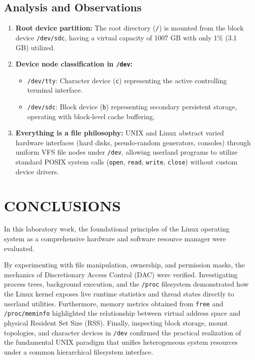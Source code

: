 \documentclass[12pt,a4paper]{report}
\numberwithin{equation}{chapter}
\numberwithin{figure}{chapter}
\numberwithin{table}{chapter}
\begin{document}
\section{Analysis and Observations}
\begin{enumerate}
    \item \textbf{Root device partition:} The root directory (\texttt{/}) is mounted from the block device \texttt{/dev/sdc}, having a virtual capacity of 1007 GB with only 1\% (3.1 GB) utilized.
    \item \textbf{Device node classification in \texttt{/dev}:}
    \begin{itemize}
        \item \texttt{/dev/tty}: Character device (\texttt{c}) representing the active controlling terminal interface.
        \item \texttt{/dev/sdc}: Block device (\texttt{b}) representing secondary persistent storage, operating with block-level cache buffering.
    \end{itemize}
    \item \textbf{Everything is a file philosophy:} UNIX and Linux abstract varied hardware interfaces (hard disks, pseudo-random generators, consoles) through uniform VFS file nodes under \texttt{/dev}, allowing userland programs to utilize standard POSIX system calls (\texttt{open}, \texttt{read}, \texttt{write}, \texttt{close}) without custom device drivers.
\end{enumerate}

\chapter{CONCLUSIONS}
In this laboratory work, the foundational principles of the Linux operating system as a comprehensive hardware and software resource manager were evaluated. 

By experimenting with file manipulation, ownership, and permission masks, the mechanics of Discretionary Access Control (DAC) were verified. Investigating process trees, background execution, and the \texttt{/proc} filesystem demonstrated how the Linux kernel exposes live runtime statistics and thread states directly to userland utilities. Furthermore, memory metrics obtained from \texttt{free} and \texttt{/proc/meminfo} highlighted the relationship between virtual address space and physical Resident Set Size (RSS). Finally, inspecting block storage, mount topologies, and character devices in \texttt{/dev} confirmed the practical realization of the fundamental UNIX paradigm that unifies heterogeneous system resources under a common hierarchical filesystem interface.
\end{document}
